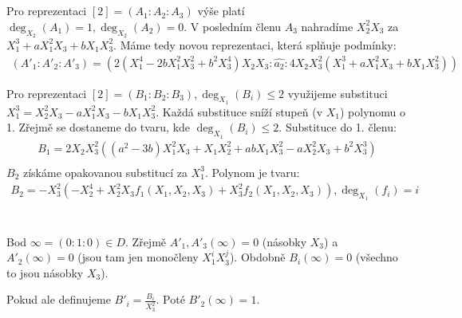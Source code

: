 \documentclass[12pt, a4paper]{article}
\begin{document}
\section{}
Pro reprezentaci $[2] = (A_1 : A_2 : A_3)$ výše platí $\deg_{X_2}(A_1) = 1, \deg_{X_2}(A_2) = 0$. V posledním členu $A_3$ nahradíme $X_2^2X_3$ za $X_1^3+aX_1^2X_3+bX_1X_3^2$. Máme tedy novou reprezentaci, která splňuje podmínky:
\begin{gather*}
(A'_1 : A'_2 : A'_3) = (2(X_1^4-2bX_1^2X_3^2 + b^2X_3^4)X_2X_3 : \widehat{a_2} : 4X_2X_3^2(X_1^3+aX_1^2X_3+bX_1X_3^2))
\end{gather*}

Pro reprezentaci $[2] = (B_1 : B_2 : B_3), \deg_{X_1}(B_i)\leq 2$ využijeme substituci $X_1^3 = X_2^2X_3-aX_1^2X_3-bX_1X_3^2$. Každá substituce sníží stupeň (v $X_1$) polynomu o 1. Zřejmě se dostaneme do tvaru, kde $\deg_{X_1}(B_i)\leq 2$. Substituce do 1. členu:
\begin{gather*}
B_1 = 2X_2X_3^2((a^2-3b)X_1^2X_3+X_1X_2^2+abX_1X_3^2-aX_2^2X_3+b^2X_3^3)\\
\end{gather*}
$B_2$ získáme opakovanou substitucí za $X_1^3$. Polynom je tvaru:
\begin{gather*}
B_2 = -X_3^2(-X_2^4+X_2^2X_3f_1(X_1,X_2,X_3) + X_3^2f_2(X_1,X_2,X_3)), \deg_{X_1}(f_i) = i
\end{gather*}

\section{}
Bod $\infty = (0:1:0) \in D$. Zřejmě $A'_1,A'_3(\infty) = 0$ (násobky $X_3$) a $A'_2(\infty) = 0$ (jsou tam jen monočleny $X_1^iX_3^j$). Obdobně $B_i(\infty)=0$ (všechno to jsou násobky $X_3$).

Pokud ale definujeme $B'_i = \frac{B_i}{X_3^2}$. Poté $B'_2(\infty) = 1$.

\section{}
\end{document}
